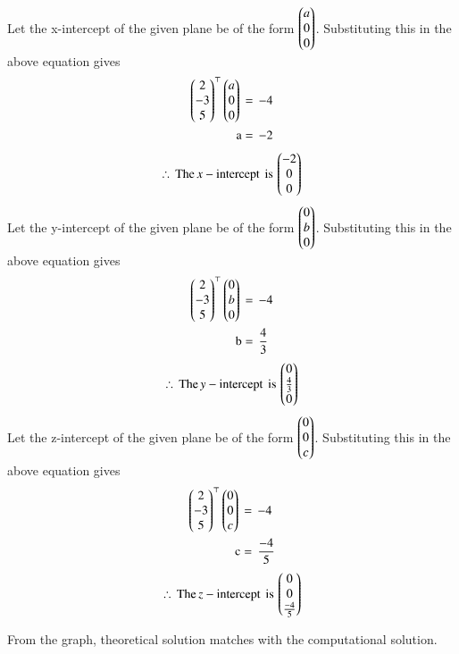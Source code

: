 \documentclass[journal,12pt,onecolumn]{IEEEtran}
\theoremstyle{remark}
\begin{document}
Let the x-intercept of the given plane be of the form $\begin{pmatrix}a\\0\\0\end{pmatrix}$. Substituting this in the above equation gives
\begin{align}
   \begin{pmatrix}2\\-3\\5\end{pmatrix}^\top \begin{pmatrix}a\\0\\0\end{pmatrix}\,&=\,-4\\
    \text{a}&=\,-2
\end{align}
\begin{align*}
    \therefore \,\text{The}\, x-\text{intercept \,is\,} \begin{pmatrix}-2\\0\\0\end{pmatrix}
\end{align*}
Let the y-intercept of the given plane be of the form $\begin{pmatrix}0\\b\\0\end{pmatrix}$. Substituting this in the above equation gives
\begin{align}
   \begin{pmatrix}2\\-3\\5\end{pmatrix}^\top \begin{pmatrix}0\\b\\0\end{pmatrix}\,&=\,-4\\
    \text{b}&=\,\frac{4}{3}
\end{align}
\begin{align*}
    \therefore \,\text{The}\, y-\text{intercept \,is\,} \begin{pmatrix}0\\\frac{4}{3}\\0\end{pmatrix}
\end{align*}
    Let the z-intercept of the given plane be of the form $\begin{pmatrix}0\\0\\c\end{pmatrix}$. Substituting this in the above equation gives
\begin{align}
   \begin{pmatrix}2\\-3\\5\end{pmatrix}^\top \begin{pmatrix}0\\0\\c\end{pmatrix}\,&=\,-4\\
    \text{c}&=\,\frac{-4}{5}
\end{align}
\begin{align*}
    \therefore \,\text{The}\, z-\text{intercept \,is\,} \begin{pmatrix}0\\0\\\frac{-4}{5}\end{pmatrix}
\end{align*}

From the graph, theoretical solution matches with the computational solution.
\end{document}

